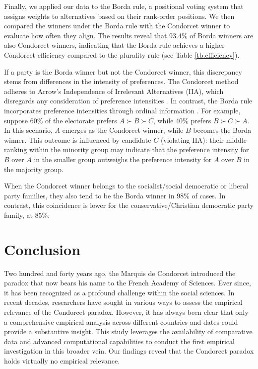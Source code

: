 \documentclass[12pt]{scrartcl}
\begin{document}
Finally, we applied our data to the Borda rule, a positional voting system that assigns weights to alternatives based on their rank-order positions. We then compared the winners under the Borda rule with the Condorcet winner to evaluate how often they align. The results reveal that 93.4\% of Borda winners are also Condorcet winners, indicating that the Borda rule achieves a higher Condorcet efficiency compared to the plurality rule (see Table \ref{tb.efficiency}).

If a party is the Borda winner but not the Condorcet winner, this discrepancy stems from differences in the intensity of preferences. The Condorcet method adheres to Arrow's Independence of Irrelevant Alternatives (IIA), which disregards any consideration of preference intensities \citep[Ch.~7]{Sen2017}. In contrast, the Borda rule incorporates preference intensities through ordinal information \citep{Maskin2024}. For example, suppose 60\% of the electorate prefers $A \succ B \succ C$, while 40\% prefers $B \succ C \succ A$. In this scenario, $A$ emerges as the Condorcet winner, while $B$ becomes the Borda winner. This outcome is influenced by candidate $C$ (violating IIA): their middle ranking within the minority group may indicate that the preference intensity for $B$ over $A$ in the smaller group outweighs the preference intensity for $A$ over $B$ in the majority group.

When the Condorcet winner belongs to the socialist/social democratic or liberal party families, they also tend to be the Borda winner in 98\% of cases. In contrast, this coincidence is lower for the conservative/Christian democratic party family, at 85\%. 

\section{Conclusion}
Two hundred and forty years ago, the Marquis de Condorcet introduced the paradox that now bears his name to the French Academy of Sciences. Ever since, it has been recognized as a profound challenge within the social sciences. In recent decades, researchers have sought in various ways to assess the empirical relevance of the Condorcet paradox. However, it has always been clear that only a comprehensive empirical analysis across different countries and dates could provide a substantive insight. This study leverages the availability of comparative data and advanced computational capabilities to conduct the first empirical investigation in this broader vein. Our findings reveal that the Condorcet paradox holds virtually no empirical relevance.
\end{document}

